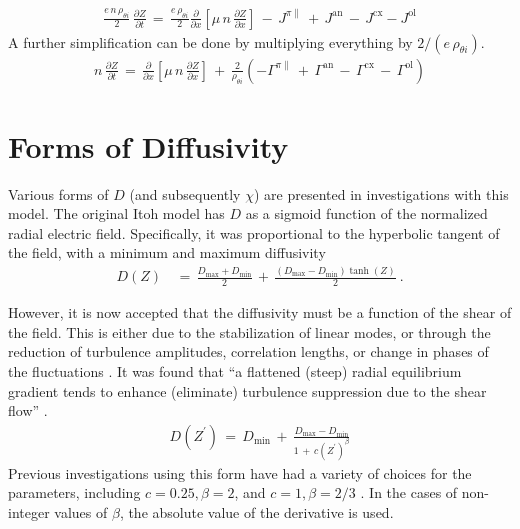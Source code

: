 \begin{align} %
	\frac{e \, n \, \rho_{\theta i}}{2} \, \frac{\partial Z}{\partial t}
		\,=\, \frac{e \, \rho_{\theta i}}{2} \frac{\partial}{\partial x}
		\left[\mu \, n \, \frac{\partial Z}{\partial x}\right] \,-\,
		J^{\pi\parallel} \,+\, J^\text{an} \,-\, J^\text{cx} - J^\text{ol}
		\label{eq:normalized_Z_equation}
\end{align}
A further simplification can be done by multiplying everything by $2 / (e \, \rho_{\theta i})$.
\begin{align} %
	n \, \frac{\partial Z}{\partial t} \,=\, \frac{\partial}{\partial x}
		\left[\mu \, n \, \frac{\partial Z}{\partial x}\right] \,+\,
		\frac{2}{\rho_{\theta i}} \left(-\Gamma^{\pi\parallel} \,+\,
		\Gamma^\text{an} \,-\, \Gamma^\text{cx} \,-\, \Gamma^\text{ol}\right)
		\label{eq:reduced_normalized_Z_equation}
\end{align}

\section{Forms of Diffusivity}\label{sec:diffusivity}
Various forms of $D$ (and subsequently $\chi$) are presented in investigations with this model.
The original Itoh model has $D$ as a sigmoid function of the normalized radial electric field.
Specifically, it was proportional to the hyperbolic tangent of the field, with a minimum and maximum diffusivity \cite{itoh_edge_1991, zohm_dynamic_1994}
\begin{align} %
	D(Z) \,&=\, \frac{D_\text{max} + D_\text{min}}{2} \,+\,
		\frac{(D_\text{max} - D_\text{min})\tanh(Z)}{2}~.
		\label{eq:Itoh_diffusivity}
\end{align}

However, it is now accepted that the diffusivity must be a function of the shear of the field.
This is either due to the stabilization of linear modes, or through the reduction of turbulence amplitudes, correlation lengths, or change in phases of the fluctuations \cite{connor_review_2000}.
It was found that ``a flattened (steep) radial equilibrium gradient tends to enhance (eliminate) turbulence suppression due to the shear flow'' \cite{zhang_edge_1992}.
\begin{align} %
	D(Z^{\prime}) \,=\, D_\text{min} \,+\, \frac{D_\text{max} - D_\text{min}}
		{1 \,+\, c(Z^{\prime})^{\beta}} \label{eq:shear_diffusivity}
\end{align}
Previous investigations using this form have had a variety of choices for the parameters, including $c = 0.25, \beta = 2$, and $c = 1, \beta = 2/3$ \cite{connor_review_2000} \cite{itoh_theoretical_1994}.
In the cases of non-integer values of $\beta$, the absolute value of the derivative is used.

